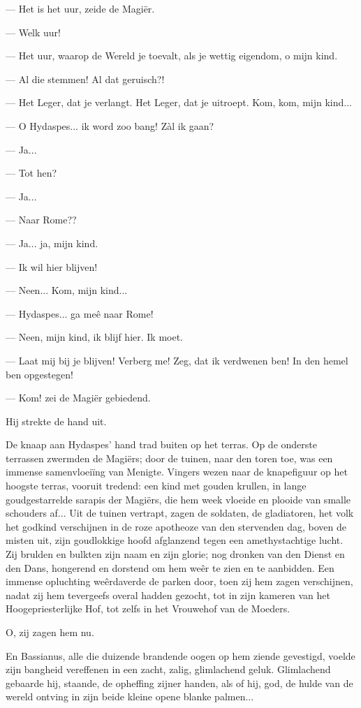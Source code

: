 \documentclass[a4paper, 12pt, oneside, dutch]{article}
\begin{document}
--- Het is het uur, zeide de Magiër.

--- Welk uur!

--- Het uur, waarop de Wereld je toevalt, als je wettig eigendom, o mijn kind.

--- Al die stemmen! Al dat geruisch?!

--- Het Leger, dat je verlangt. Het Leger, dat je uitroept. Kom, kom, mijn kind...

--- O Hydaspes... ik word zoo bang! Zàl ik gaan?

--- Ja...

--- Tot hen?

--- Ja...

--- Naar Rome??

--- Ja... ja, mijn kind.

--- Ik wil hier blijven!

--- Neen... Kom, mijn kind...

--- Hydaspes... ga meê naar Rome!

--- Neen, mijn kind, ik blijf hier. Ik moet.

--- Laat mij bij je blijven! Verberg me! Zeg, dat ik verdwenen ben! In den hemel ben opgestegen!

--- Kom! zei de Magiër gebiedend.

Hij strekte de hand uit.

De knaap aan Hydaspes' hand trad buiten op het terras. Op de onderste terrassen zwermden de Magiërs; door de tuinen, naar den toren toe, was een immense samenvloeiïng van Menigte. Vingers wezen naar de knapefiguur op het hoogste terras, vooruit tredend: een kind met gouden krullen, in lange goudgestarrelde sarapis der Magiërs, die hem week vloeide en plooide van smalle schouders af... Uit de tuinen vertrapt, zagen de soldaten, de gladiatoren, het volk het godkind verschijnen in de roze apotheoze van den stervenden dag, boven de misten uit, zijn goudlokkige hoofd afglanzend tegen een amethystachtige lucht. Zij brulden en bulkten zijn naam en zijn glorie; nog dronken van den Dienst en den Dans, hongerend en dorstend om hem weêr te zien en te aanbidden. Een immense opluchting weêrdaverde de parken door, toen zij hem zagen verschijnen, nadat zij hem tevergeefs overal hadden gezocht, tot in zijn kameren van het Hoogepriesterlijke Hof, tot zelfs in het Vrouwehof van de Moeders.

O, zij zagen hem nu.

En Bassianus, alle die duizende brandende oogen op hem ziende gevestigd, voelde zijn bangheid vereffenen in een zacht, zalig, glimlachend geluk. Glimlachend gebaarde hij, staande, de opheffing zijner handen, als of hij, god, de hulde van de wereld ontving in zijn beide kleine opene blanke palmen...
\end{document}
